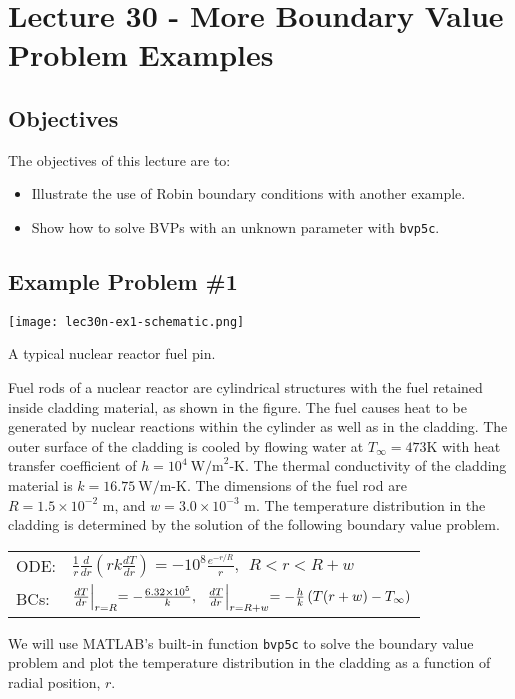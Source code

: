 \chapter{Lecture 30 - More Boundary Value Problem Examples}
\label{ch:lec30n}
\section{Objectives}
The objectives of this lecture are to:
\begin{itemize}
\item Illustrate the use of Robin boundary conditions with another example.
\item Show how to solve BVPs with an unknown parameter with \lstinline[style=myMatlab]{bvp5c}.
\end{itemize}
\setcounter{lstannotation}{0}

\section{Example Problem \#1}
\begin{marginfigure}
\texttt{[image: lec30n-ex1-schematic.png]}
\caption{A typical nuclear reactor fuel pin.}
\label{fig:lec30n-ex1-schematic}
\end{marginfigure}
Fuel rods of a nuclear reactor are cylindrical structures with the fuel retained inside cladding material, as shown in the figure.  The fuel causes heat to be generated by nuclear reactions within the cylinder as well as in the cladding. The outer surface of the cladding is cooled by flowing water at $T_{\infty}=473$K with heat transfer coefficient of $h=10^4\ \text{W/m}^2\text{-K}$.  The thermal conductivity of the cladding material is $k=16.75 \ \text{W/m-K}$.  The dimensions of the fuel rod are $R=1.5\times 10^{-2}\text{ m}$, and $w=3.0\times 10^{-3}\text{ m}$. The temperature distribution in the cladding is determined by the solution of the following boundary value problem.  
\begin{table}
\begin{tabular}{l l}
ODE: & $\frac{1}{r}\frac{d}{dr}\left(rk\frac{dT}{dr}\right)=-10^8\frac{e^{-r/R}}{r}, \ \  R < r < R+w $ \\
BCs: & $\frac{dT}{dr}\Bigl|_{r=R}=-\frac{6.32\times 10^5}{k}, \ \ \frac{dT}{dr}\Bigl|_{r=R+w}=-\frac{h}{k}\left(T(r+w)-T_{\infty}\right)$ \\
\end{tabular}
\end{table}
We will use MATLAB's built-in function \lstinline[style=myMatlab]{bvp5c} to solve the boundary value problem and plot the temperature distribution in the cladding as a function of radial position, $r$.

